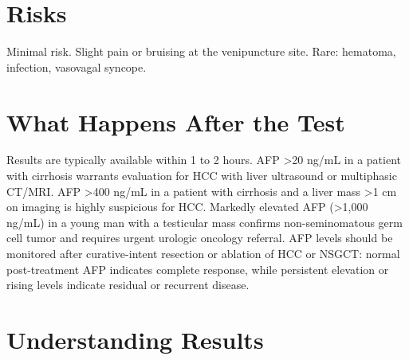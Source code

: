 \section*{Risks}
Minimal risk. Slight pain or bruising at the venipuncture site. Rare: hematoma, infection, vasovagal syncope.

\section*{What Happens After the Test}
Results are typically available within 1 to 2 hours. AFP >20 ng/mL in a patient with cirrhosis warrants evaluation for HCC with liver ultrasound or multiphasic CT/MRI. AFP >400 ng/mL in a patient with cirrhosis and a liver mass >1 cm on imaging is highly suspicious for HCC. Markedly elevated AFP (>1,000 ng/mL) in a young man with a testicular mass confirms non-seminomatous germ cell tumor and requires urgent urologic oncology referral. AFP levels should be monitored after curative-intent resection or ablation of HCC or NSGCT: normal post-treatment AFP indicates complete response, while persistent elevation or rising levels indicate residual or recurrent disease.

\section*{Understanding Results}

